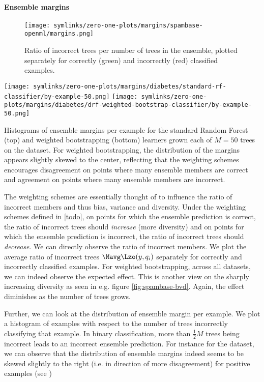 \documentclass[../main.tex]{subfiles}
\begin{document}
\paragraph{Ensemble margins} 
\begin{figure*}
    \texttt{[image: symlinks/zero-one-plots/margins/spambase-openml/margins.png]}
    \caption{
        Ratio of incorrect trees per number of trees in the ensemble, plotted separately for correctly (green) and incorrectly (red) classified examples. 
    }
    \label{fig:mnist-en}
\end{figure*}
\begin{marginfigure}
    \texttt{[image: symlinks/zero-one-plots/margins/diabetes/standard-rf-classifier/by-example-50.png]}
    \texttt{[image: symlinks/zero-one-plots/margins/diabetes/drf-weighted-bootstrap-classifier/by-example-50.png]}
    \caption{
        Histograms of ensemble margins per example for the standard Random Forest (top) and weighted bootstrapping (bottom) learners grown each of $M=50$ trees on the \diabetes dataset. For weighted bootstrapping, the distribution of the margins appears slightly skewed to the center, reflecting that the weighting schemes encourages disagreement on points where many ensemble members are correct and agreement on points where many ensemble members are incorrect.
    }
    \label{fig:cover-margins-50}
\end{marginfigure}
The weighting schemes are essentially thought of to influence the ratio of incorrect members and thus bias, variance and diversity. Under the weighting schemes defined in \ref{todo}, on points for which the ensemble prediction is correct, the ratio of incorrect trees should \textit{increase} (more diversity) and on points for which the ensemble prediction is incorrect, the ratio of incorrect trees should \textit{decrease}.
We can directly observe the ratio of incorrect members. We plot the average ratio of incorrect trees $\Mavg \Lzo(y, q_i)$ separately for correctly and incorrectly classified examples. For weighted bootstrapping, across all datasets, we can indeed observe the expected effect. This is another view on the sharply increasing diversity as seen in e.g. figure \ref{fig:spambase-bvd}. Again, the effect diminishes as the number of trees grows.

Further, we can look at the distribution of ensemble margin per example. We plot a histogram of examples with respect to the number of trees incorrectly classifying that example. In binary classification, more than $\frac{1}{2}M$ trees being incorrect leads to an incorrect ensemble prediction. %
For instance for the \cover dataset, we can observe that the distribution of ensemble margins indeed seems to be skewed slightly to the right (i.e. in direction of more disagreement) for positive examples (see )
\end{document}
